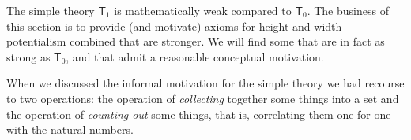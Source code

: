 \documentclass{article}
\begin{document}
The simple theory $\mathsf{T}_1$ is mathematically weak compared to $\mathsf{T}_0$.
The business of this section is to provide (and motivate) axioms for height and width 
potentialism combined that are stronger. We will find some that are in fact 
as strong as $\mathsf{T}_0$, and that admit a reasonable conceptual motivation.

When we discussed the informal motivation for the simple theory we had recourse to 
two operations: the operation of \emph{collecting} together some things into a set 
and the operation of \emph{counting out} some things, that is, correlating them 
one-for-one with the natural numbers.
\end{document}
